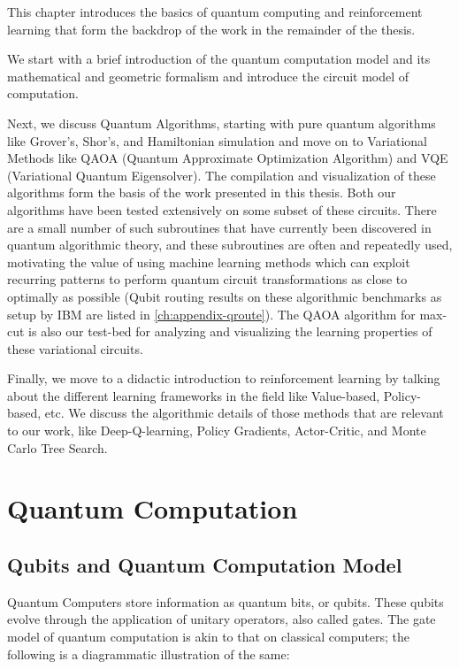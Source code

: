 This chapter introduces the basics of quantum computing and reinforcement learning that form the backdrop of the work in the remainder of the thesis.

We start with a brief introduction of the quantum computation model and its mathematical and geometric formalism and introduce the circuit model of computation. 

Next, we discuss Quantum Algorithms, starting with pure quantum algorithms like Grover's, Shor's, and Hamiltonian simulation and move on to Variational Methods like QAOA (Quantum Approximate Optimization Algorithm) and VQE (Variational Quantum Eigensolver). The compilation and visualization of these algorithms form the basis of the work presented in this thesis. Both our algorithms have been tested extensively on some subset of these circuits. There are a small number of such subroutines that have currently been discovered in quantum algorithmic theory, and these subroutines are often and repeatedly used, motivating the value of using machine learning methods which can exploit recurring patterns to perform quantum circuit transformations as close to optimally as possible (Qubit routing results on these algorithmic benchmarks as setup by IBM are listed in \ref{ch:appendix-qroute}). The QAOA algorithm for max-cut is also our test-bed for analyzing and visualizing the learning properties of these variational circuits.

Finally, we move to a didactic introduction to reinforcement learning by talking about the different learning frameworks in the field like Value-based, Policy-based, etc. We discuss the algorithmic details of those methods that are relevant to our work, like Deep-Q-learning, Policy Gradients, Actor-Critic, and Monte Carlo Tree Search.

\section{Quantum Computation}


\subsection{Qubits and Quantum Computation Model}

Quantum Computers store information as quantum bits, or qubits. These qubits evolve through the application of unitary operators, also called gates. The gate model of quantum computation is akin to that on classical computers; the following is a diagrammatic illustration of the same:

